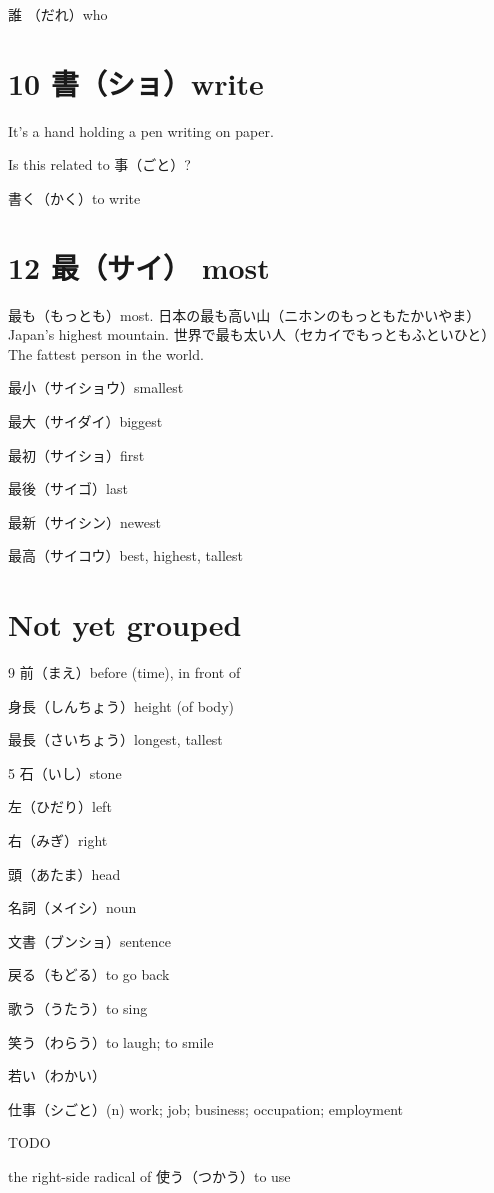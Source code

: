 誰 （だれ）who

\section{10 書（ショ）write}

It's a hand holding a pen writing on paper.

Is this related to 事（ごと）?

書く（かく）to write

\section{12 最（サイ） most}

最も（もっとも）most.
日本の最も高い山（ニホンのもっともたかいやま）Japan's highest mountain.
世界で最も太い人（セカイでもっともふといひと）The fattest person in the world.

最小（サイショウ）smallest

最大（サイダイ）biggest

最初（サイショ）first

最後（サイゴ）last

最新（サイシン）newest

最高（サイコウ）best, highest, tallest

\section{Not yet grouped}

9 前（まえ）before (time), in front of

身長（しんちょう）height (of body)

最長（さいちょう）longest, tallest

5 石（いし）stone

左（ひだり）left

右（みぎ）right

頭（あたま）head

名詞（メイシ）noun

文書（ブンショ）sentence

戻る（もどる）to go back

歌う（うたう）to sing

笑う（わらう）to laugh; to smile

若い（わかい）

仕事（シごと）(n) work; job; business; occupation; employment

TODO

the right-side radical of 使う（つかう）to use


